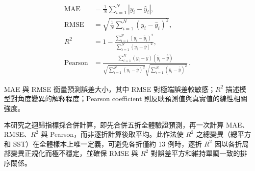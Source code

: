 \begin{ZhChapter}
\begin{equation}
\label{eq:regression_metrics}
\begin{aligned}
\mathrm{MAE} &= \frac{1}{N}\sum_{i=1}^{N}\left|y_i-\hat{y}_i\right|,\\
\mathrm{RMSE} &= \sqrt{\frac{1}{N}\sum_{i=1}^{N}\left(y_i-\hat{y}_i\right)^2},\\
R^2 &= 1-\frac{\sum_{i=1}^{N}\left(y_i-\hat{y}_i\right)^2}
{\sum_{i=1}^{N}\left(y_i-\bar{y}\right)^2},\\
\mathrm{Pearson} &=
\frac{\sum_{i=1}^{N}\left(y_i-\bar{y}\right)\left(\hat{y}_i-\bar{\hat{y}}\right)}
{\sqrt{\sum_{i=1}^{N}\left(y_i-\bar{y}\right)^2}
\sqrt{\sum_{i=1}^{N}\left(\hat{y}_i-\bar{\hat{y}}\right)^2}}\, .
\end{aligned}
\end{equation}

MAE 與 RMSE 衡量預測誤差大小，其中 RMSE 對極端誤差較敏感；\(R^2\) 描述模型對角度變異的解釋程度；Pearson coefficient 則反映預測值與真實值的線性相關強度。

本研究之迴歸指標採合併計算，即先合併五折全體驗證預測，再一次計算 MAE、RMSE、\(R^2\) 與 Pearson，而非逐折計算後取平均。此作法使 \(R^2\) 之總變異（總平方和 SST）在全體樣本上唯一定義，可避免各折僅約 13 例時，逐折 \(R^2\) 因以各折局部變異正規化而極不穩定，並確保 RMSE 與 \(R^2\) 對誤差平方和維持單調一致的排序關係。

\end{ZhChapter}
